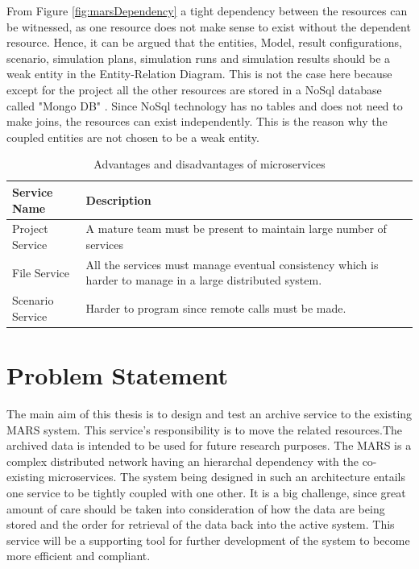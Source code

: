         From Figure \ref{fig:marsDependency} a tight dependency between the resources can be witnessed,  
        as one resource does not make sense to exist without the dependent resource. 
        Hence, it can be argued that the entities, Model, result configurations, scenario, simulation plans, 
        simulation runs and simulation results should be a weak entity in the Entity-Relation Diagram. This is not
        the case here because except for the project all the other resources are stored in a NoSql database
        called "Mongo DB" \cite{MongoDB}. Since NoSql technology has no tables and does not need to make joins,
        the resources can exist independently. This is the reason why the coupled entities are not chosen to 
        be a weak entity.

        \newpage
         

        \begin{table}[h!]
            \centering
            \begin{tabular}{|p{3cm}|p{11cm}|}
                \hline
                    \textbf{Service Name}  & \textbf{Description}\\
                \hline
                    Project Service & 
                    A mature team must be present to maintain large number of services \\
                \hline
                    File Service
                    & All the services must manage eventual consistency which is
                    harder to manage in a large distributed system.\\
                \hline
                    Scenario Service  & Harder to program since remote calls must be made.\\
                \hline
            \end{tabular}
            \caption{Advantages and disadvantages of microservices \cite{FowlerMartin}}
            \label{table:Advantages and disadvantages of microservices}     
        \end{table}    

    \section{Problem Statement}

        The main aim of this thesis is to design and test an archive service
        to the existing MARS system. This service's responsibility is to move the related resources.The archived data is intended 
        to be used for future research purposes.
        The MARS is a complex distributed network having an
        hierarchal dependency with the co-existing microservices. The system being designed
        in such an architecture entails one service to be tightly coupled with one other. It is 
        a big challenge, since great amount of care should be taken into consideration of how the 
        data are being stored and the order for retrieval of the data back into the active system.
        This service will be a supporting tool for further development of the system to become more 
        efficient and compliant. 
         

